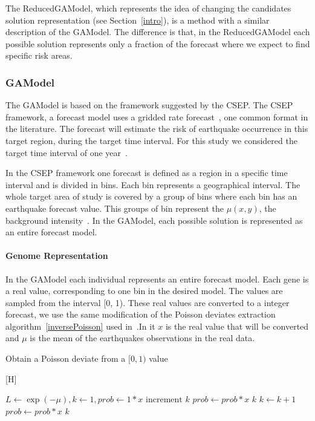 The ReducedGAModel, which represents the idea of changing the
candidates solution representation (see Section~\ref{intro}), is a
method with a similar description of the GAModel. The difference is
that, in the ReducedGAModel each possible solution represents only a
fraction of the forecast where we expect to find specific risk areas.


\subsubsection{GAModel}\label{GAModel}
The GAModel is based on the framework suggested by the CSEP. The CSEP framework, a forecast model uses a gridded rate
forecast~\cite{zechar2010evaluating}, one common format in the
literature. The forecast will estimate the risk of earthquake occurrence in this target region, during the target time interval. For this study we considered the target time interval of one year~\cite{ecta14}.

 In the CSEP framework one forecast is defined as a region in a specific time interval and is divided in bins. Each bin represents a geographical interval. The whole target area of study is covered by a group of bins where each bin has an earthquake forecast value. This groups of bin represent the $\mu(x,y)$, the background intensity~\cite{zhuang2004analyzing}. In the GAModel, each possible solution is represented as an entire forecast model.

\paragraph{Genome Representation}\label{genomeGA}
In the GAModel each individual represents an entire forecast model. Each gene is a real value, corresponding to one bin in the desired model. The values are sampled from the interval [0, 1). These real values are converted to a integer forecast, we use the same modification of the Poisson deviates extraction algorithm~\ref{inversePoisson} used in~\cite{ecta14}.In it $x$ is the real value that will be converted and $\mu$ is the mean of the earthquakes observations in the real data.

\begin{algorithm}\label{inversePoisson}
	\caption{Obtain a Poisson deviate from a $[0,1)$ value}
	\label{InversePoisson}[H]
	\begin{algorithmic}
		\STATE $L \gets \exp{(-\mu)}, k \gets 1, prob \gets 1 * x$
		\REPEAT 
		\STATE $\text{increment }k$
		\STATE $prob \gets prob*x$
		\RETURN $k$
		\STATE $k \gets k + 1$
		\STATE $prob \gets prob*x$
		\ENDWHILE
		\RETURN $k$
	\end{algorithmic}
\end{algorithm}

